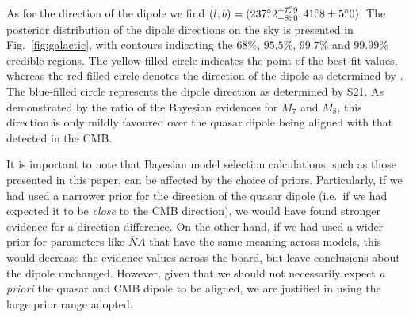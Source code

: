\documentclass[fleqn,usenatbib]{mnras}
\newcommand{\dotdeg}{\rlap{.}^\circ}
\begin{document}
As for the direction of the dipole we find
$(l,b) = (237\dotdeg2^{+7\dotdeg9}_{-8\dotdeg0} , 41\dotdeg8\pm5\dotdeg0)$. 
The posterior distribution of the dipole directions on the sky is presented in Fig.~\ref{fig:galactic}, with contours indicating the 
 $68\%$, $95.5\%$, $99.7\%$ and $99.99\%$ credible regions. The yellow-filled circle indicates the point of the best-fit values, whereas the red-filled circle denotes the direction of the dipole as determined by \citet{2020A&A...641A...3P}. The blue-filled circle represents the dipole direction as determined by S21. As demonstrated by the ratio of the Bayesian evidences for $M_7$ and $M_8$, this direction is only mildly favoured 
 over the quasar dipole being aligned with that detected in the CMB.

It is important to note that Bayesian model selection calculations, such as those presented 
in this paper, can be affected by the choice of priors. Particularly, if we had used a narrower
prior for the direction of the quasar dipole (i.e.~if we had
expected it to be {\em close} to the CMB direction), we would have
found stronger evidence for a direction difference. On the other hand,
if we had used a wider prior for parameters like
$\bar{N}A$ that have the same meaning across models,
this would decrease the evidence values across the board, but leave conclusions about
the dipole unchanged. However, given that we should not necessarily expect {\it a priori} the quasar 
and CMB dipole to be aligned, we are justified in using the large prior range adopted.
\end{document}
